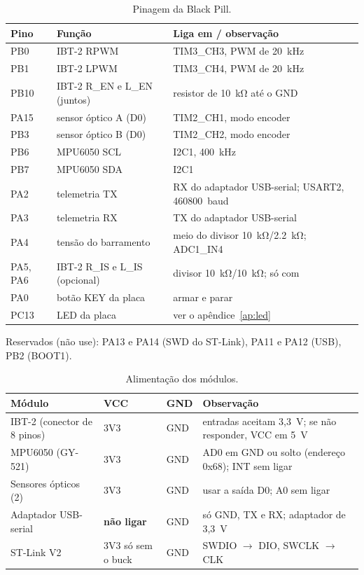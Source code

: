 \documentclass[11pt,a4paper]{article}
\newcommand{\cmd}[1]{\texttt{\detokenize{#1}}}   %
\newcommand{\flecha}{\ensuremath{\rightarrow}}
\begin{document}
\begin{table}[H]
\centering\small
\caption{Pinagem da Black Pill.}
\label{tab:pinagem}
\begin{tabularx}{\textwidth}{@{}l>{\raggedright\arraybackslash}p{4.4cm}>{\raggedright\arraybackslash}X@{}}
\toprule
Pino & Função & Liga em / observação \\
\midrule
PB0 & IBT-2 RPWM & TIM3\_CH3, PWM de 20~kHz \\
PB1 & IBT-2 LPWM & TIM3\_CH4, PWM de 20~kHz \\
PB10 & IBT-2 R\_EN e L\_EN (juntos) & resistor de \qty{10}{\kilo\ohm} até o GND \\
PA15 & sensor óptico A (D0) & TIM2\_CH1, modo encoder \\
PB3 & sensor óptico B (D0) & TIM2\_CH2, modo encoder \\
PB6 & MPU6050 SCL & I2C1, 400~kHz \\
PB7 & MPU6050 SDA & I2C1 \\
PA2 & telemetria TX & RX do adaptador USB-serial; USART2, 460800~baud \\
PA3 & telemetria RX & TX do adaptador USB-serial \\
PA4 & tensão do barramento & meio do divisor \qty{10}{\kilo\ohm}/\qty{2,2}{\kilo\ohm};
  ADC1\_IN4 \\
PA5, PA6 & IBT-2 R\_IS e L\_IS (opcional) & divisor \qty{10}{\kilo\ohm}/\qty{10}{\kilo\ohm};
  só com \cmd{USE_CURRENT_SENSE 1} \\
PA0 & botão KEY da placa & armar e parar \\
PC13 & LED da placa & ver o apêndice~\ref{ap:led} \\
\bottomrule
\end{tabularx}
\end{table}

Reservados (não use): PA13 e PA14 (SWD do ST-Link), PA11 e PA12 (USB), PB2 (BOOT1).

\begin{table}[H]
\centering\small
\caption{Alimentação dos módulos.}
\label{tab:modulos}
\begin{tabularx}{\textwidth}{@{}>{\raggedright\arraybackslash}p{4.2cm}ll>{\raggedright\arraybackslash}X@{}}
\toprule
Módulo & VCC & GND & Observação \\
\midrule
IBT-2 (conector de 8 pinos) & 3V3 & GND & entradas aceitam 3,3~V; se não responder,
  VCC em 5~V \\
MPU6050 (GY-521) & 3V3 & GND & AD0 em GND ou solto (endereço 0x68); INT sem ligar \\
Sensores ópticos (2) & 3V3 & GND & usar a saída D0; A0 sem ligar \\
Adaptador USB-serial & \textbf{não ligar} & GND & só GND, TX e RX; adaptador de 3,3~V \\
ST-Link V2 & 3V3 só sem o buck & GND & SWDIO \flecha{} DIO, SWCLK \flecha{} CLK \\
\bottomrule
\end{tabularx}
\end{table}
\end{document}
